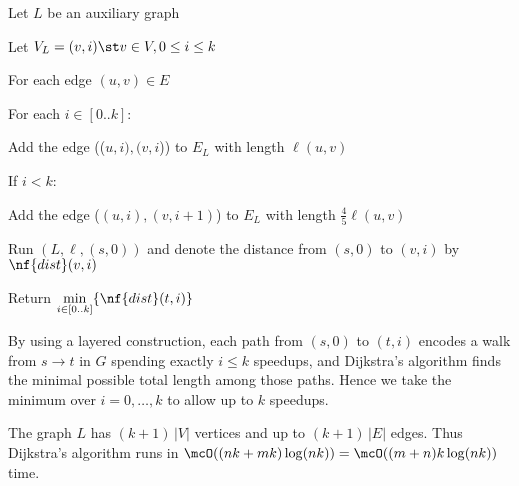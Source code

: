 \documentclass{article}
\begin{document}
\begin{solution}
\begin{steps}
  \item Let $ L $ be an auxiliary graph
  \item Let $V_L = { (v, i) \st v \in V, 0 \leq i \leq k }$ \begin{steps}
    \item For each edge $(u,v)\in E$ \begin{steps}
      \item For each $ i\in[0..k] $: \begin{steps}
        \item Add the edge (($ u,i ),( v,i $)) to $ E_L $ with length $ \ell(u,v) $
        \item If $ i<k $: \begin{steps}
          \item Add the edge ($(u, i), (v, i+1)$) to $ E_L $ with length $\frac{4}{5}\ell(u,v)$
        \end{steps}
      \end{steps}
    \end{steps}
  \end{steps}
  \item Run $(L,\ell,(s,0))$ and denote the distance from $ (s,0) $ to $ (v,i) $ by $ \nf{dist}(v,i) $
  \item Return $ \min\limits_{i\in[0..k]}\{\nf{dist}(t,i)\} $
\end{steps}
By using a layered construction, each path from $(s,0)$ to $(t,i)$ encodes a walk from $s\to t$ in $G$ spending exactly $i \leq k$ speedups, and Dijkstra's algorithm finds the minimal possible total length among those paths.
Hence we take the minimum over $i=0,\dots,k$ to allow up to $k$ speedups.

The graph $L$ has $(k+1)\,|V|$ vertices and up to $(k+1)\,|E|$ edges.
Thus Dijkstra's algorithm runs in $\mcO((nk + mk)\log(nk))=\mcO((m+n)k\log(nk))$ time.


\end{solution}
\pagebreak
\end{document}
